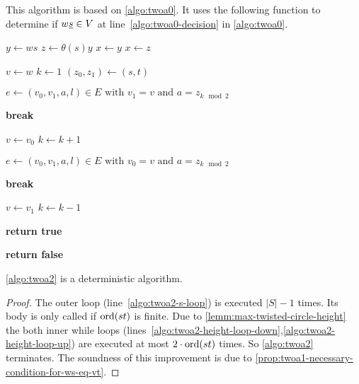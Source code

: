 \begin{algo}[TWOA2]
	This algorithm is based on \ref{algo:twoa0}. It uses the following function to determine if $w \underline{s} \in V$ at line~\ref{algo:twoa0-decision} in \ref{algo:twoa0}.

	\begin{algorithmic}[1]
		\State $y \gets ws$
		\State $z \gets \theta(s)y$
		 
			\State $x \gets y$
		\Else
			\State $x \gets z$
		\EndIf

		 \label{algo:twoa2-s-loop}
				\State $v \gets w$
				\State $k \gets 1$
				\State $(z_0,z_1) \gets (s,t)$

				 \label{algo:twoa2-height-loop-down} 
					\State $e \gets (v_0,v_1,a,l) \in E \textrm{ with } v_1 = v \textrm{ and } a = z_{k \mod 2}$

						\State \textbf{break}
					\EndIf

					\State $v \gets v_0$
					\State $k \gets k + 1$
				\EndWhile

				 \label{algo:twoa2-height-loop-up} 
					\State $e \gets (v_0,v_1,a,l) \in E \textrm{ with } v_0 = v \textrm{ and } a = z_{k \mod 2}$

						\State \textbf{break}
					\EndIf

					\State $v \gets v_1$
					\State $k \gets k - 1$
				\EndWhile

				 
					 
						\State \textbf{return true}
					\EndIf
				\EndIf
			\EndIf
		\EndFor

		\State \textbf{return false}
	\EndProcedure
	\end{algorithmic}
\end{algo}

\begin{lemm}
	\ref{algo:twoa2} is a deterministic algorithm.

	\begin{proof}
		The outer loop (line~\ref{algo:twoa2-s-loop}) is executed $|S|-1$ times. Its body is only called if $\operatorname{ord}(st)$ is finite. Due to \ref{lemm:max-twisted-circle-height} the both inner while loops (lines~\ref{algo:twoa2-height-loop-down},\ref{algo:twoa2-height-loop-up}) are executed at most $2 \cdot \operatorname{ord}(st)$ times. So \ref{algo:twoa2} terminates. The soundness of this improvement is due to \ref{prop:twoa1-necessary-condition-for-ws-eq-vt}.
	\end{proof}
\end{lemm}


